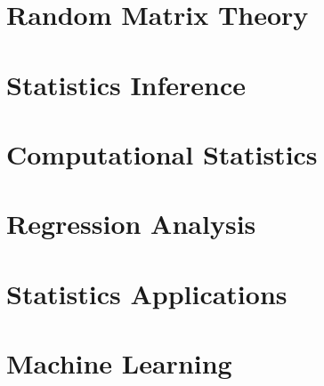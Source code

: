 \documentclass[12pt]{prettybook}
\begin{document}
\part{Random Matrix Theory}




\part{Statistics Inference}








\part{Computational Statistics}



\part{Regression Analysis}






\part{Statistics Applications}




\part{Machine Learning}





\end{document}
